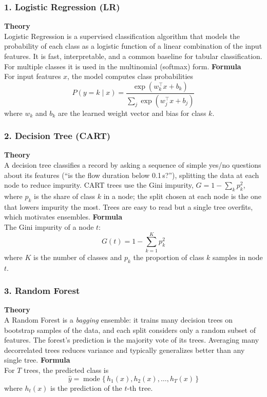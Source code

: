 \documentclass[12pt,a4paper]{article}
\begin{document}
\subsubsection*{1. Logistic Regression (LR)}
\textbf{Theory}\\
Logistic Regression is a supervised classification algorithm that models the
probability of each class as a logistic function of a linear combination of the input
features. It is fast, interpretable, and a common baseline for tabular
classification. For multiple classes it is used in the multinomial (softmax) form.
\textbf{Formula}\\
For input features $x$, the model computes class probabilities
\begin{equation}
  P(y = k \mid x) = \frac{\exp(w_k^\top x + b_k)}{\sum_{j} \exp(w_j^\top x + b_j)}
\end{equation}
where $w_k$ and $b_k$ are the learned weight vector and bias for class $k$.

\subsubsection*{2. Decision Tree (CART)}
\textbf{Theory}\\
A decision tree classifies a record by asking a sequence of simple yes/no questions
about its features (``is the flow duration below 0.1\,s?''), splitting the data at
each node to reduce impurity. CART trees use the Gini impurity,
$G = 1 - \sum_k p_k^2$, where $p_k$ is the share of class $k$ in a node; the split
chosen at each node is the one that lowers impurity the most. Trees are easy to read
but a single tree overfits, which motivates ensembles.
\textbf{Formula}\\
The Gini impurity of a node $t$:
\begin{equation}
  G(t) = 1 - \sum_{k=1}^{K} p_k^2
\end{equation}
where $K$ is the number of classes and $p_k$ the proportion of class $k$ samples in
node $t$.

\subsubsection*{3. Random Forest}
\textbf{Theory}\\
A Random Forest is a \emph{bagging} ensemble: it trains many decision trees on
bootstrap samples of the data, and each split considers only a random subset of
features. The forest's prediction is the majority vote of its trees. Averaging many
decorrelated trees reduces variance and typically generalizes better than any single
tree.
\textbf{Formula}\\
For $T$ trees, the predicted class is
\begin{equation}
  \hat{y} = \operatorname{mode}\{\, h_1(x), h_2(x), \ldots, h_T(x) \,\}
\end{equation}
where $h_t(x)$ is the prediction of the $t$-th tree.
\end{document}
